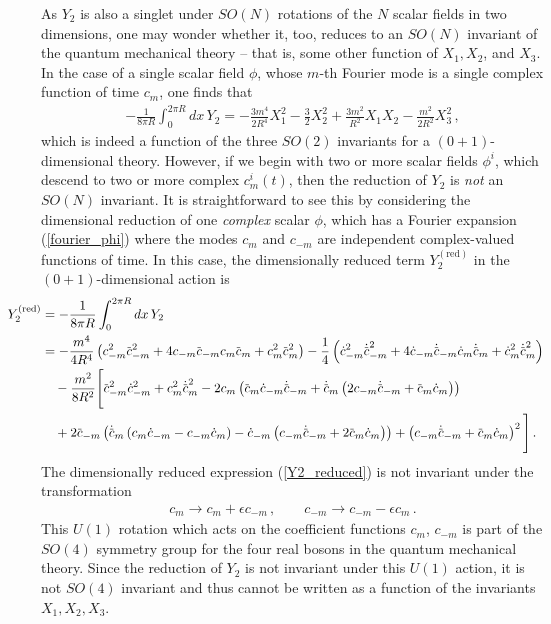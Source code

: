 \documentclass[12pt]{article}
\numberwithin{equation}{section}
\newcommand{\overbar}[1]{\mkern 1.5mu\overline{\mkern-1.5mu#1\mkern-1.5mu}\mkern 1.5mu}
\def\cbar{{\overbar{c}}}
\begin{document}
As $Y_2$ is also a singlet under $SO(N)$ rotations of the $N$ scalar fields in two dimensions, one may wonder whether it, too, reduces to an $SO(N)$ invariant of the quantum mechanical theory -- that is, some other function of $X_1, X_2$, and $X_3$. In the case of a single scalar field $\phi$, whose $m$-th Fourier mode is a single complex function of time $c_m$, one finds that
%
\begin{align}
    - \frac{1}{8 \pi R} \int_{0}^{2 \pi R} dx \, Y_2 = - \frac{3 m^4}{2 R^4} X_1^2 - \frac{3}{2} X_2^2 + \frac{3 m^2}{R^2} X_1 X_2 - \frac{m^2}{2 R^2} X_3^2 \, , 
\end{align}
%
which is indeed a function of the three $SO(2)$ invariants for a $(0+1)$-dimensional theory. However, if we begin with two or more scalar fields $\phi^i$, which descend to two or more complex $c^i_m ( t )$, then the reduction of $Y_2$ is \emph{not} an $SO(N)$ invariant. It is straightforward to see this by considering the dimensional reduction of one \emph{complex} scalar $\phi$, which has a Fourier expansion (\ref{fourier_phi}) where the modes $c_m$ and $c_{-m}$ are independent complex-valued functions of time. In this case, the dimensionally reduced term $Y_2^{(\text{red})}$ in the $(0+1)$-dimensional action is
%
\begin{align}\hspace{-40pt}\label{Y2_reduced}
    Y_2^{(\text{red})} &= - \frac{1}{8 \pi R} \int_0^{2 \pi R} dx \, Y_2 \, \nonumber \\
    &= - \frac{m^4}{4 R^4} \left( c_{-m}^2 \cbar_{-m}^2 + 4 c_{-m} \cbar_{-m} c_m \cbar_m + c_m^2 \cbar_m^2 \right) - \frac{1}{4} \left( \dot{c}_{-m}^2 \dot{\cbar}_{-m}^2 + 4 \dot{c}_{-m} \dot{\cbar}_{-m} \dot{c}_m \dot{\cbar}_m + \dot{c}_m^2 \dot{\cbar}_m^2 \right) \nonumber \\
    &\quad - \frac{m^2}{8 R^2} \Bigg[ \cbar_{-m}^2 \dot{c}_{-m}^2 +c_m^2 \dot{\cbar}_m^2 - 2 c_m \left(\cbar_m \dot{c}_{-m} \dot{\cbar}_{-m}+\dot{\cbar}_m \left(2 c_{-m} \dot{\cbar}_{-m}+\cbar_m \dot{c}_m\right)\right) \nonumber \\
    &\quad + 2 \cbar_{-m} \left(\dot{\cbar}_m \left(c_m \dot{c}_{-m}-c_{-m} \dot{c}_m\right)-\dot{c}_{-m} \left(c_{-m} \dot{\cbar}_{-m}+2 \cbar_m \dot{c}_m\right)\right)+\left(c_{-m} \dot{\cbar}_{-m}+\cbar_m \dot{c}_m\right)^2\Bigg] \, .
\end{align}
%
The dimensionally reduced expression (\ref{Y2_reduced}) is not invariant under the transformation
%
\begin{align}
    c_m \to c_m + \epsilon c_{-m} \, , \qquad c_{-m} \to c_{-m} - \epsilon c_m \, .
\end{align}
%
This $U(1)$ rotation which acts on the coefficient functions $c_m$, $c_{-m}$ is part of the $SO(4)$ symmetry group for the four real bosons in the quantum mechanical theory. Since the reduction of $Y_2$ is not invariant under this $U(1)$ action, it is not $SO(4)$ invariant and thus cannot be written as a function of the invariants $X_1, X_2, X_3$.
\end{document}
